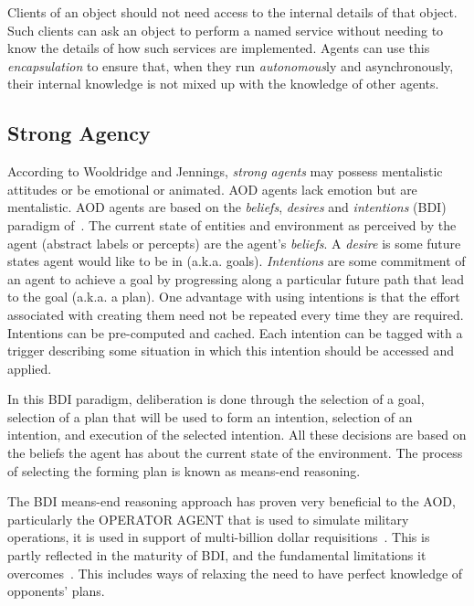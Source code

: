  Clients of an
object should not need access to the internal details of that object. Such
clients can ask an object to perform a named service without needing to know
the details of how such services are implemented. Agents can use this {\em
encapsulation} to ensure that, when they run {\em autonomous}ly and
asynchronously, their internal knowledge is not mixed up with the knowledge of
other agents.



\subsection{Strong Agency}\label{sec:bdi}

According to Wooldridge and Jennings, {\em strong agents} may possess
mentalistic attitudes or be emotional or animated. AOD agents lack emotion but
are mentalistic. AOD agents are based on the {\em beliefs}, {\em desires} and
{\em intentions} (BDI) paradigm of~\cite{rao95}. The current state of entities
and environment as perceived by the agent (abstract labels or percepts) are the
agent's {\em beliefs}. A {\em desire} is some  future states agent would like
to be in (a.k.a. goals). {\em Intentions} are some  commitment of an agent to
achieve a goal by progressing along a particular future path that lead to the
goal (a.k.a. a plan). One advantage with using intentions is that the effort
associated with creating them need not be repeated every time they are
required. Intentions can be pre-computed and cached. Each intention can be
tagged with a trigger describing some situation in which this intention should
be accessed and applied.

In this BDI paradigm, deliberation is done through the selection
of a goal, selection of a plan that will be used to form an
intention, selection of an intention, and execution of the
selected intention. All these decisions are based on the beliefs
the agent has about the current state of the environment. The
process of selecting the forming plan is known as means-end
reasoning.



The BDI means-end reasoning approach has proven very beneficial to
the AOD, particularly the OPERATOR AGENT that is used to simulate
military operations, it is used in support of multi-billion dollar
requisitions~\cite{tidhar99}. This is partly reflected in the
maturity of BDI, and the fundamental limitations it
overcomes~\cite{rao95}. This includes ways of relaxing the need to
have perfect knowledge of opponents' plans.

